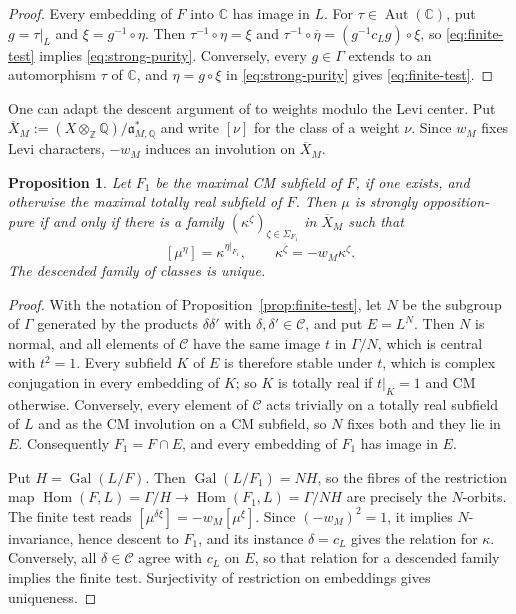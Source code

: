 \documentclass[12pt]{amsart}
\numberwithin{equation}{section}
\theoremstyle{plain}
\newtheorem{proposition}[theorem]{Proposition}
\theoremstyle{definition}
\theoremstyle{remark}
\renewcommand{\bar}{\overline}
\begin{document}
\begin{proof}
Every embedding of $F$ into $\mathbb C$ has image in $L$. For $\tau\in\operatorname{Aut}(\mathbb C)$, put $g=\tau|_L$ and $\xi=g^{-1}\circ\eta$. Then $\tau^{-1}\circ\eta=\xi$ and $\tau^{-1}\circ\bar\eta=(g^{-1}c_Lg)\circ\xi$, so \eqref{eq:finite-test} implies \eqref{eq:strong-purity}. Conversely, every $g\in\Gamma$ extends to an automorphism $\tau$ of $\mathbb C$, and $\eta=g\circ\xi$ in \eqref{eq:strong-purity} gives \eqref{eq:finite-test}. 
\end{proof}

One can adapt the descent argument of \cite[Prop.~2.6]{Raghuram2025}
to weights modulo the Levi center. Put $\overline X_M:=(X\otimes_{\mathbb Z}\mathbb Q)/\mathfrak a_{M,\mathbb Q}^*$ and write $[\nu]$ for the class of a weight $\nu$. Since $w_M$ fixes Levi characters, $-w_M$ induces an involution on $\overline X_M$.

\begin{proposition} \label{prop:derived-purity-descent}
Let $F_1$ be the maximal CM subfield of $F$, if one exists, and otherwise the maximal totally real subfield of $F$. Then $\mu$ is strongly opposition-pure if and only if there is a family $(\kappa^\zeta)_{\zeta\in\Sigma_{F_1}}$ in $\overline X_M$ such that 
\[
 [\mu^\eta]=\kappa^{\eta|_{F_1}},\qquad
 \kappa^{\bar\zeta}=-w_M\kappa^\zeta.
\]
The descended family of classes is unique.
\end{proposition}

\begin{proof}
With the notation of Proposition~\ref{prop:finite-test}, let $N$ be the subgroup of $\Gamma$ generated by the products $\delta\delta'$ with $\delta,\delta'\in\mathcal C$, and put $E=L^N$. Then $N$ is normal, and all elements of $\mathcal C$ have the same image $t$ in $\Gamma/N$, which is central with $t^2=1$. Every subfield $K$ of $E$ is therefore stable under $t$, which is complex conjugation in every embedding of $K$; so $K$ is totally real if $t|_K=1$ and CM otherwise. Conversely, every element of $\mathcal C$ acts trivially on a totally real subfield of $L$ and as the CM involution on a CM subfield, so $N$ fixes both and they lie in $E$. Consequently $F_1=F\cap E$, and every embedding of $F_1$ has image in $E$.

Put $H=\operatorname{Gal}(L/F)$. Then $\operatorname{Gal}(L/F_1)=NH$, so the fibres of the restriction map $\operatorname{Hom}(F,L)=\Gamma/H\to\operatorname{Hom}(F_1,L)=\Gamma/NH$ are precisely the $N$-orbits. The finite test reads $[\mu^{\delta\xi}]=-w_M[\mu^\xi]$. Since $(-w_M)^2=1$, it implies $N$-invariance, hence descent to $F_1$, and its instance $\delta=c_L$ gives the relation for $\kappa$. Conversely, all $\delta\in\mathcal C$ agree with $c_L$ on $E$, so that relation for a descended family implies the finite test. Surjectivity of restriction on embeddings gives uniqueness.
\end{proof}
\end{document}
